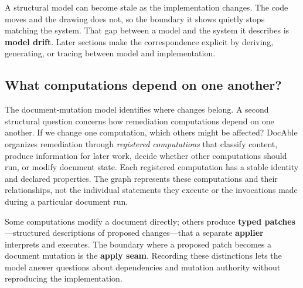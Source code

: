 

A structural model can become stale as the implementation changes. The code moves and the drawing does not, so the boundary it shows quietly stops matching the system. That gap between a model and the system it describes is \textbf{model drift}. Later sections make the correspondence explicit by deriving, generating, or tracing between model and implementation.

\subsection{What computations depend on one another?}\label{heading:what-computations-depend-on-one-another}


The document-mutation model identifies where changes belong. A second structural question concerns how remediation computations depend on one another. If we change one computation, which others might be affected? DocAble organizes remediation through \emph{registered computations} that classify content, produce information for later work, decide whether other computations should run, or modify document state. Each registered computation has a stable identity and declared properties. The graph represents these computations and their relationships, not the individual statements they execute or the invocations made during a particular document run.

Some computations modify a document directly; others produce \textbf{typed patches}---structured descriptions of proposed changes---that a separate \textbf{applier} interprets and executes. The boundary where a proposed patch becomes a document mutation is the \textbf{apply seam}. Recording these distinctions lets the model answer questions about dependencies and mutation authority without reproducing the implementation.

